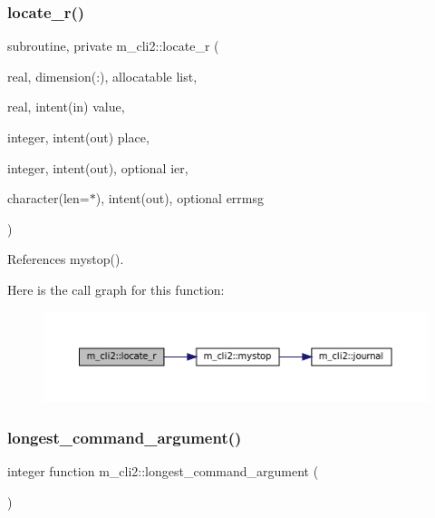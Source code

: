 \subsubsection{\texorpdfstring{locate\+\_\+r()}{locate\_r()}}
{\footnotesize\ttfamily subroutine, private m\+\_\+cli2\+::locate\+\_\+r (\begin{DoxyParamCaption}\item[{real, dimension(\+:), allocatable}]{list,  }\item[{real, intent(in)}]{value,  }\item[{integer, intent(out)}]{place,  }\item[{integer, intent(out), optional}]{ier,  }\item[{character(len=$\ast$), intent(out), optional}]{errmsg }\end{DoxyParamCaption})\hspace{0.3cm}{\ttfamily [private]}}



References mystop().

Here is the call graph for this function\+:
\nopagebreak
\begin{figure}[H]
\begin{center}
\leavevmode
\includegraphics[width=350pt]{namespacem__cli2_a2e12eb8c0ae6ce90b821141699e627df_cgraph}
\end{center}
\end{figure}
\mbox{\label{namespacem__cli2_a7240f12031027172b87fde623bd77958}} 
\subsubsection{\texorpdfstring{longest\+\_\+command\+\_\+argument()}{longest\_command\_argument()}}
{\footnotesize\ttfamily integer function m\+\_\+cli2\+::longest\+\_\+command\+\_\+argument (\begin{DoxyParamCaption}{ }\end{DoxyParamCaption})\hspace{0.3cm}{\ttfamily [private]}}



